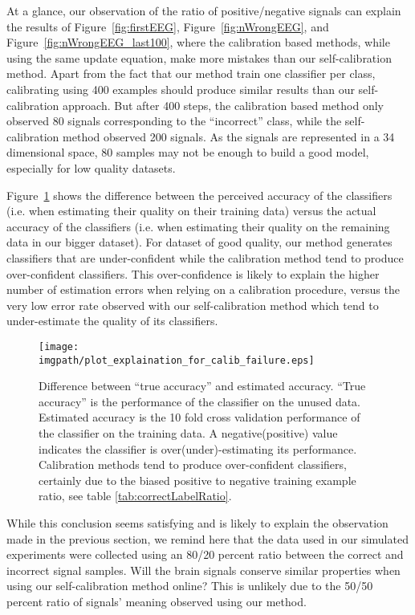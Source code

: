 At a glance, our observation of the ratio of positive/negative signals can explain the results of Figure~\ref{fig:firstEEG}, Figure~\ref{fig:nWrongEEG}, and Figure~\ref{fig:nWrongEEG_last100}, where the calibration based methods, while using the same update equation, make more mistakes than our self-calibration method. Apart from the fact that our method train one classifier per class, calibrating using 400 examples should produce similar results than our self-calibration approach. But after 400 steps, the calibration based method only observed 80 signals corresponding to the ``incorrect'' class, while the self-calibration method observed 200 signals. As the signals are represented in a 34 dimensional space, 80 samples may not be enough to build a good model, especially for low quality datasets.


Figure~\ref{fig:calibFail} shows the difference between the perceived accuracy of the classifiers (i.e. when estimating their quality on their training data) versus the actual accuracy of the classifiers (i.e. when estimating their quality on the remaining data in our bigger dataset). For dataset of good quality, our method generates classifiers that are under-confident while the calibration method tend to produce over-confident classifiers. This over-confidence is likely to explain the higher number of estimation errors when relying on a calibration procedure, versus the very low error rate observed with our self-calibration method which tend to under-estimate the quality of its classifiers.

\begin{figure}[!htbp]
\centering
\texttt{[image: \\imgpath/plot\_explaination\_for\_calib\_failure.eps]}
\caption{Difference between ``true accuracy'' and estimated accuracy. ``True accuracy'' is the performance of the classifier on the unused data. Estimated accuracy is the 10 fold cross validation performance of the classifier on the training data. A negative(positive) value indicates the classifier is over(under)-estimating its performance. Calibration methods tend to produce over-confident classifiers, certainly due to the biased positive to negative training example ratio, see table \ref{tab:correctLabelRatio}.}
\label{fig:calibFail}
\end{figure}

While this conclusion seems satisfying and is likely to explain the observation made in the previous section, we remind here that the data used in our simulated experiments were collected using an 80/20 percent ratio between the correct and incorrect signal samples. Will the brain signals conserve similar properties when using our self-calibration method online? This is unlikely due to the 50/50 percent ratio of signals' meaning observed using our method. 

